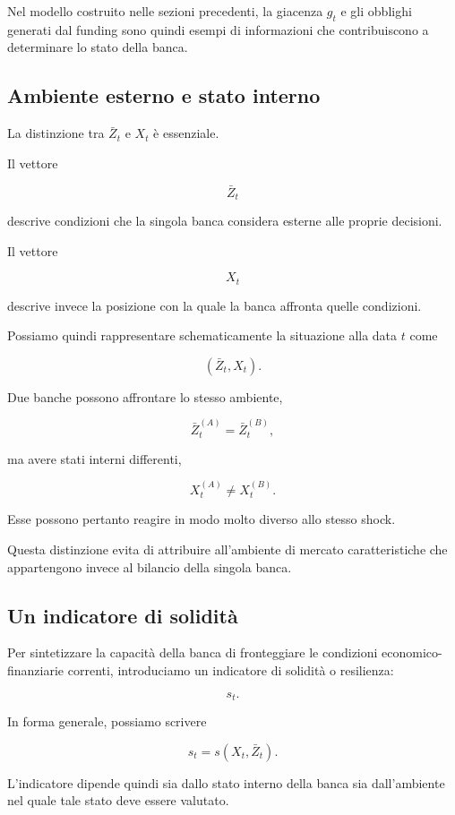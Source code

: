 Nel modello costruito nelle sezioni precedenti, la giacenza $g_t$ e gli
obblighi generati dal funding sono quindi esempi di informazioni che
contribuiscono a determinare lo stato della banca.

\subsection{Ambiente esterno e stato interno}

La distinzione tra $\bar Z_t$ e $X_t$ \`e essenziale.

Il vettore

\[
\bar Z_t
\]

\noindent descrive condizioni che la singola banca considera esterne alle proprie
decisioni.

Il vettore

\[
X_t
\]

\noindent descrive invece la posizione con la quale la banca affronta quelle
condizioni.

Possiamo quindi rappresentare schematicamente la situazione alla data $t$
come

\[
(\bar Z_t,X_t).
\]

Due banche possono affrontare lo stesso ambiente,

\[
\bar Z_t^{(A)}
=
\bar Z_t^{(B)},
\]

\noindent ma avere stati interni differenti,

\[
X_t^{(A)}
\neq
X_t^{(B)}.
\]

Esse possono pertanto reagire in modo molto diverso allo stesso shock.

Questa distinzione evita di attribuire all'ambiente di mercato caratteristiche
che appartengono invece al bilancio della singola banca.

\subsection{Un indicatore di solidit\`a}

Per sintetizzare la capacit\`a della banca di fronteggiare le condizioni
economico-finanziarie correnti, introduciamo un indicatore di solidit\`a o
resilienza:

\[
s_t.
\]

In forma generale, possiamo scrivere

\[
s_t
=
s(X_t,\bar Z_t).
\]

L'indicatore dipende quindi sia dallo stato interno della banca sia
dall'ambiente nel quale tale stato deve essere valutato.

